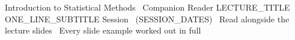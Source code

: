 \newcommand{\vocab}[1]{\textbf{\color{navy}#1}}




\thispagestyle{fancy}

\titlebanner
  {Introduction to Statistical Methods \textperiodcentered\ Companion Reader}%
  {{{LECTURE_TITLE}}}                                                        %
  {{{ONE_LINE_SUBTITLE}}}                                                    %
  {Session \SessionNo\ ({{SESSION_DATES}}) \textperiodcentered\ Read alongside the lecture slides \textperiodcentered\ Every slide example worked out in full} %

